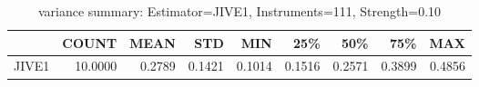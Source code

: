 \begin{table}[ht]
\centering
\caption{variance summary: Estimator=JIVE1, Instruments=111, Strength=0.10}
\begin{tabular}{lrrrrrrrr}
\toprule
 & COUNT & MEAN & STD & MIN & 25\% & 50\% & 75\% & MAX \\
\midrule
JIVE1 & 10.0000 & 0.2789 & 0.1421 & 0.1014 & 0.1516 & 0.2571 & 0.3899 & 0.4856 \\
\bottomrule
\end{tabular}
\end{table}
